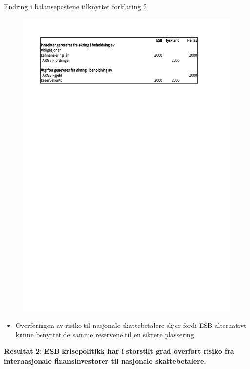 \documentclass[notes=show notes]{beamer}
\begin{document}
\begin{frame}{Endring i balansepostene tilknyttet forklaring 2}
\begin{figure}
\centering
\includegraphics[width=0.9\linewidth]{SenFork2-1}
\caption{}
\label{fig:SenFork2}
\end{figure}
\end{frame}	
\begin{frame}
\begin{itemize}
\item Overf\o ringen av risiko til nasjonale skattebetalere skjer fordi ESB alternativt kunne benyttet de samme reservene til en sikrere plassering.
\end{itemize}	
\end{frame}			
\begin{frame}
\textbf{Resultat 2: ESB krisepolitikk har i storstilt grad overf\o rt risiko fra internasjonale finansinvestorer til nasjonale skattebetalere.}
\end{frame}			
\end{document}
